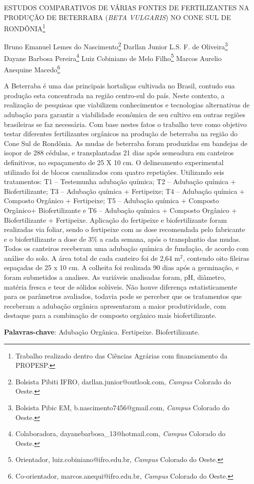 \documentclass[article,12pt,onesidea,4paper,english,brazil]{abntex2}
\begin{document}
	
	
	\frenchspacing 
	
	\begin{center}
		\LARGE ESTUDOS COMPARATIVOS DE VÁRIAS FONTES DE FERTILIZANTES NA
		PRODUÇÃO DE BETERRABA (\textit{BETA VULGARIS}) NO CONE SUL DE
		RONDÔNIA\footnote{Trabalho realizado dentro das Ciências Agrárias com financiamento da PROPESP.}
		
		\normalsize
		Bruno Emanuel Lemes do Nascimento\footnote{Bolsista Pibiti IFRO, darllan.junior@outlook.com, \textit{Campus} Colorado do Oeste.} 
		Darllan Junior L.S. F. de Oliveira\footnote{Bolsista Pibic EM, b.nascimento7456@gmail.com, \textit{Campus} Colorado do Oeste.} \\
		Dayane Barbosa Pereira\footnote{Colaboradora, dayanebarbosa\_13@hotmail.com, \textit{Campus} Colorado do Oeste.} 
		Luiz Cobiniano de Melo Filho\footnote{Orientador, luiz.cobiniano@ifro.edu.br, \textit{Campus} Colorado do Oeste.}
		Marcos Aurelio Anequine Macedo\footnote{Co-orientador, marcos.anequi@ifro.edu.br, \textit{Campus} Colorado do Oeste.} 
	\end{center}
	
	\noindent A Beterraba é uma das principais hortaliças cultivada no Brasil, contudo sua
	produção esta concentrada na região centro-sul do país. Neste contexto, a
	realização de pesquisas que viabilizem conhecimentos e tecnologias alternativas de
	adubação para garantir a viabilidade econômica de seu cultivo em outras regiões
	brasileiras se faz necessária. Com base nestes fatos o trabalho teve como objetivo
	testar diferentes fertilizantes orgânicos na produção de beterraba na região do Cone Sul de Rondônia. As mudas de beterraba foram produzidas em bandejas de isopor
	de 288 cédulas, e transplantadas 21 dias após semeadura em canteiros definitivos,
	no espaçamento de 25 X 10 cm. O delineamento experimental utilizado foi de blocos
	casualizados com quatro repetições. Utilizando seis tratamentos: T1 – Testemunha
	adubação química; T2 – Adubação química + Biofertilizante; T3 – Adubação química
	+ Fertipeixe; T4 – Adubação química + Composto Orgânico + Fertipeixe; T5 –
	Adubação química + Composto Orgânico+ Biofertilizante e T6 – Adubação química +
	Composto Orgânico + Biofertilizante + Fertipeixe. Aplicação do fertipeixe e
	biofertilizante foram realizadas via foliar, sendo o fertipeixe com as dose
	recomendada pelo fabricante e o biofertilizante a dose de 3\% a cada semana, após
	o transplantio das mudas. Todos os canteiros receberam uma adubação química de
	fundação, de acordo com análise do solo. A área total de cada canteiro foi de 2,64
	m$^2$, contendo oito fileiras espaçadas de 25 x 10 cm. A colheita foi realizada 90 dias
	após a germinação, e foram submetidos a analises. As variáveis analisadas foram,
	pH, diâmetro, matéria fresca e teor de sólidos solúveis. Não houve diferença
	estatisticamente para os parâmetros avaliados, todavia pode se perceber que os
	tratamentos que receberam a adubação orgânica apresentaram a maior
	produtividade, com destaque para a combinação de composto orgânico mais
	biofertilizante.
	
	\vspace{\onelineskip}
	
	\noindent
	\textbf{Palavras-chave}: Adubação Orgânica. Fertipeixe. Biofertilizante.	
	
\end{document}

